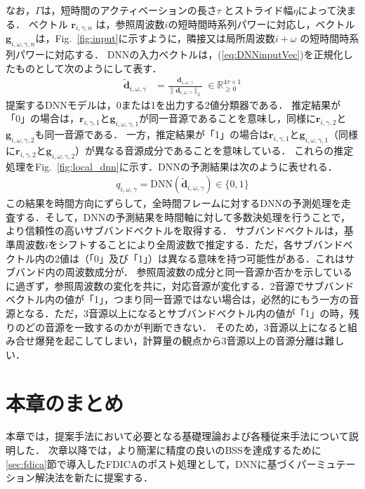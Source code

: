   なお，$\Gamma$は，短時間のアクティベーションの長さ$\tau$ とストライド幅$\eta$によって決まる．
  ベクトル $\bm{r}_{i,\gamma,n}$ は，参照周波数$i$の短時間時系列パワーに対応し，ベクトル $\bm{g}_{i,\omega,\gamma,n}$は，Fig.~\ref{fig:input}に示すように，隣接又は局所周波数$i+\omega$ の短時間時系列パワーに対応する．
  DNNの入力ベクトルは，(\ref{eq:DNNinputVec})を正規化したものとして次のようにして表す．
\begin{align}
  \tilde{\bm{d}}_{i, \omega, \gamma} &=\frac{\bm{d}_{i, \omega, \gamma} }{ \|{\bm{d}_{i, \omega, \gamma} }\|_2}~\in \mathbb{R}_{\geq 0}^{4\tau \times 1}  \label{eq:input}
\end{align}
提案するDNNモデルは，0または1を出力する2値分類器である．
推定結果が「0」の場合は，$\bm{r}_{i,\gamma, 1}$と$\bm{g}_{i,\omega,\gamma, 1}$が同一音源であることを意味し，同様に$\bm{r}_{i,\gamma, 2}$と$\bm{g}_{i,\omega,\gamma, 2}$も同一音源である．
一方，推定結果が「1」の場合は$\bm{r}_{i,\gamma, 1}$と$\bm{g}_{i,\omega,\gamma, 1}$（同様に$\bm{r}_{i,\gamma, 2}$と$\bm{g}_{i,\omega,\gamma, 2}$）が異なる音源成分であることを意味している．
これらの推定処理をFig.~\ref{fig:local_dnn}に示す．DNNの予測結果は次のように表せれる．
\begin{align}
  q_{i,\omega,\gamma} = \mathrm{DNN}\left(\tilde{\bm{d}}_{i,\omega,\gamma}\right) \in \{0, 1\}
\end{align}
この結果を時間方向にずらして，全時間フレームに対するDNNの予測処理を走査する．そして，DNNの予測結果を時間軸に対して多数決処理を行うことで，より信頼性の高いサブバンドベクトルを取得する．
サブバンドベクトルは，基準周波数$i$をシフトすることにより全周波数で推定する．ただ，各サブバンドベクトル内の2値は（「0」及び「1」）は異なる意味を持つ可能性がある．これはサブバンド内の周波数成分が．
参照周波数の成分と同一音源か否かを示しているに過ぎず，参照周波数の変化を共に，対応音源が変化する．2音源でサブバンドベクトル内の値が「1」，つまり同一音源ではない場合は，必然的にもう一方の音源となる．ただ，3音源以上になるとサブバンドベクトル内の値が「1」の時，残りのどの音源を一致するのかが判断できない．
そのため，3音源以上になると組み合せ爆発を起こしてしまい，計算量の観点から3音源以上の音源分離は難しい．

\section{本章のまとめ}
本章では，提案手法において必要となる基礎理論および各種従来手法について説明した．
次章以降では，より簡潔に精度の良いのBSSを達成するために\ref{sec:fdica}節で導入したFDICAのポスト処理として，DNNに基づくパーミュテーション解決法を新たに提案する．
















